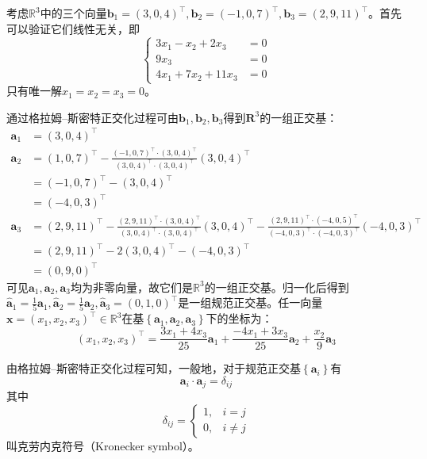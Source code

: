 \documentclass[main.tex]{subfiles}
\begin{document}
\begin{example}
考虑$\mathbb{R}^3$中的三个向量$\mathbf{b}_1=\left(3,0,4\right)^\intercal,\mathbf{b}_2=\left(-1,0,7\right)^\intercal,\mathbf{b}_3=\left(2,9,11\right)^\intercal$。首先可以验证它们线性无关，即
\[
\left\{\begin{array}{rl}
3x_1-x_2+2x_3&=0\\ 
9x_3&=0\\ 
4x_1+7x_2+11x_3&=0
\end{array}\right.
\]
只有唯一解$x_1=x_2=x_3=0$。

通过格拉姆--斯密特正交化过程可由$\mathbf{b}_1,\mathbf{b}_2,\mathbf{b}_3$得到$\mathbf{R}^3$的一组正交基：
\begin{align*}
    \mathbf{a}_1&=\left(3,0,4\right)^\intercal\\
    \mathbf{a}_2&=\left(1,0,7\right)^\intercal-\frac{\left(-1,0,7\right)^\intercal\cdot\left(3,0,4\right)^\intercal}{\left(3,0,4\right)^\intercal\cdot\left(3,0,4\right)^\intercal}\left(3,0,4\right)^\intercal\\
    &=\left(-1,0,7\right)^\intercal-\left(3,0,4\right)^\intercal\\
    &=\left(-4,0,3\right)^\intercal\\
    \mathbf{a}_3&=\left(2,9,11\right)^\intercal-\frac{\left(2,9,11\right)^\intercal\cdot\left(3,0,4\right)^\intercal}{\left(3,0,4\right)^\intercal\cdot\left(3,0,4\right)^\intercal}\left(3,0,4\right)^\intercal-\frac{\left(2,9,11\right)^\intercal\cdot\left(-4,0,5\right)^\intercal}{\left(-4,0,3\right)^\intercal\cdot\left(-4,0,3\right)^\intercal}\left(-4,0,3\right)^\intercal\\
    &=\left(2,9,11\right)^\intercal-2\left(3,0,4\right)^\intercal-\left(-4,0,3\right)^\intercal\\
    &=\left(0,9,0\right)^\intercal
\end{align*}
可见$\mathbf{a}_1,\mathbf{a}_2,\mathbf{a}_3$均为非零向量，故它们是$\mathbb{R}^3$的一组正交基。归一化后得到$\mathbf{\hat{a}}_1=\frac{1}{5}\mathbf{a}_1,\mathbf{\hat{a}}_2=\frac{1}{5}\mathbf{a}_2,\mathbf{\hat{a}}_3=\left(0,1,0\right)^\intercal$是一组规范正交基。任一向量$\mathbf{x}=\left(x_1,x_2,x_3\right)^\intercal\in\mathbb{R}^3$在基$\left\{\mathbf{a}_1,\mathbf{a}_2,\mathbf{a}_3\right\}$下的坐标为：
\[\left(x_1,x_2,x_3\right)^\intercal=\frac{3x_1+4x_3}{25}\mathbf{a}_1+\frac{-4x_1+3x_3}{25}\mathbf{a}_2+\frac{x_2}{9}\mathbf{a}_3\]

由格拉姆--斯密特正交化过程可知，一般地，对于规范正交基$\left\{\mathbf{a}_i\right\}$有
\[\mathbf{a}_i\cdot\mathbf{a}_j=\delta_{ij}\]
其中
\[\delta_{ij}=\left\{\begin{array}{ll}
1,&i=j\\
0,&i\neq j
\end{array}\right.
\]
叫克劳内克符号（Kronecker symbol）。


\end{example}
\end{document}
